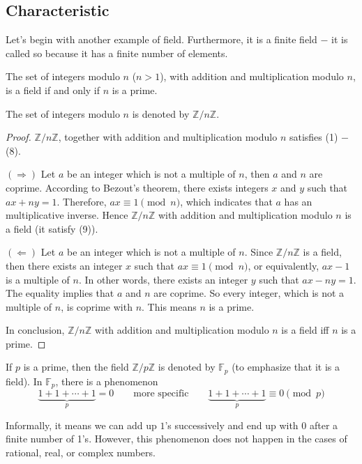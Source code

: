 \subsection{Characteristic}

Let's begin with another example of field. Furthermore, it is a finite field $-$ it is called so because it has a finite number of elements.

\begin{theorem}
	The set of integers modulo $n$ ($n > 1$), with addition and multiplication modulo $n$, is a field if and only if $n$ is a prime.
\end{theorem}

The set of integers modulo $n$ is denoted by $\mathbb{Z}/n\mathbb{Z}$.

\begin{proof}
	$\mathbb{Z}/n\mathbb{Z}$, together with addition and multiplication modulo $n$ satisfies (1) $-$ (8).

	$(\Rightarrow)$ Let $a$ be an integer which is not a multiple of $n$, then $a$ and $n$ are coprime. According to Bezout's theorem, there exists integers $x$ and $y$ such that $ax + ny = 1$. Therefore, $ax\equiv 1\pmod{n}$, which indicates that $a$ has an multiplicative inverse. Hence $\mathbb{Z}/n\mathbb{Z}$ with addition and multiplication modulo $n$ is a field (it satisfy (9)).

	$(\Leftarrow)$ Let $a$ be an integer which is not a multiple of $n$. Since $\mathbb{Z}/n\mathbb{Z}$ is a field, then there exists an integer $x$ such that $ax\equiv 1\pmod{n}$, or equivalently, $ax - 1$ is a multiple of $n$. In other words, there exists an integer $y$ such that $ax - ny = 1$. The equality implies that $a$ and $n$ are coprime. So every integer, which is not a multiple of $n$, is coprime with $n$. This means $n$ is a prime.

	In conclusion, $\mathbb{Z}/n\mathbb{Z}$ with addition and multiplication modulo $n$ is a field iff $n$ is a prime.
\end{proof}

If $p$ is a prime, then the field $\mathbb{Z}/p\mathbb{Z}$ is denoted by $\mathbb{F}_{p}$ (to emphasize that it is a field). In $\mathbb{F}_{p}$, there is a phenomenon
\[
	\underbrace{1 + 1 + \cdots + 1}_{p} = 0 \qquad \text{more specific}\qquad \underbrace{1 + 1 + \cdots + 1}_{p} \equiv 0\pmod{p}
\]

Informally, it means we can add up $1$'s successively and end up with $0$ after a finite number of 1's. However, this phenomenon does not happen in the cases of rational, real, or complex numbers.

